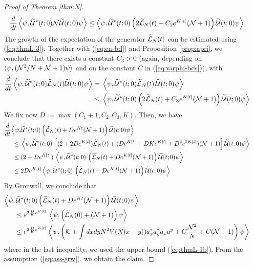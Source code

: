 \documentclass[11pt,a4paper,DIV11]{scrartcl}	%
\newcommand{\cU}{{\cal U}}
\newcommand{\wt}{\widetilde}
\newcommand{\cK}{{\cal K}}
\newcommand{\cL}{{\cal L}}
\newcommand{\cN}{{\cal N}}
\begin{document}
\begin{proof}[Proof of Theorem \ref{thm:N}]
\[ \begin{split} 
\frac{d}{dt} \left\langle \psi, \wt{\cU}^* (t;0) \cN \wt{\cU} (t;0) \psi \right\rangle  \leq  \left\langle \psi , \wt{\cU}^* (t;0)  \left(2 \wt{\cL}_N (t) +C_2 e^{K|t|} (\cN + 1) \right)  \wt{\cU} (t;0) \psi \right\rangle
\end{split} \]
The growth of the expectation of the generator $\wt{\cL}_N (t)$ can be estimated using (\ref{eq:thmL-3}). Together with (\ref{eq:en-bd}) and Proposition \ref{prop:apri}, we conclude that there exists a constant $C_3 >0$ (again, depending on $\langle \psi , (\cN^2/ N + \cN + 1) \psi \rangle$ and on the constant $C$ in (\ref{eq:varphi-bds})), with 
\[ \begin{split}
\frac{d}{dt} \left\langle \psi, \wt{\cU}^* (t;0) \wt{\cL}_N (t) \wt{\cU} (t;0) \psi \right\rangle = \; & \left\langle \psi, \wt{\cU}^* (t;0) \dot{\wt{\cL}}_N (t) \, \wt{\cU} (t;0) \psi \right\rangle \\ \leq \; & \left\langle \psi , \wt{\cU}^* (t;0) \left( 2 \wt{\cL}_N (t) + C_3 e^{K|t|} (\cN + 1) \right) \wt{\cU} (t;0) \psi \right\rangle 
\end{split} \]
We fix now $D := \max (C_1 + 1, C_2 , C_3 , K)$. Then, we have
\[ \begin{split} 
\frac{d}{dt} \Big\langle \psi , &\wt{\cU}^* (t;0) \left( \wt{\cL}_N (t) + D e^{K t} (\cN + 1) \right) \wt{\cU} (t;0) \psi \Big\rangle \\  \leq \; & \left\langle \psi, \wt{\cU}^* (t;0) \, \left[ (2 + 2D e^{K|t|}) \wt{\cL}_N (t) + (D e^{K |t|} +D K e^{K |t|} + D^2 e^{2K |t|}) (\cN + 1) \right] \wt{\cU} (t;0) \psi \right\rangle\\  \leq \; &(2 + D e^{K|t|}) \, \left\langle \psi, \wt{\cU}^* (t;0) \, \left( \wt{\cL}_N (t) + D e^{K|t|} (\cN + 1) \right) \wt{\cU} (t;0) \psi \right \rangle \\ \leq \; & 2D e^{K |t|} \left\langle \psi, \wt{\cU}^* (t;0) \, \left( \wt{\cL}_N (t) + D e^{K|t|} (\cN + 1) \right) \wt{\cU} (t;0) \psi \right\rangle \end{split} \]
By Gronwall, we conclude that
\[ \begin{split}  \Big\langle \psi , \wt{\cU}^* &(t;0) \left( \wt{\cL}_N (t) + 
D e^{K t} (\cN + 1) \right) \wt{\cU} (t;0) \psi \Big\rangle \\ \leq \; & e^{2 \frac{D}{K} e^{K |t|}} \, \left\langle \psi , \left( \wt{\cL}_N (0) + (\cN + 1)\right) \psi \right\rangle \\ \leq \; &  e^{2 \frac{D}{K} e^{K |t|}} \left\langle \psi , \left( \cK + \int dx dy N^2 V(N (x-y)) a_x^* a_y^* a_x a^y + C \frac{\cN^2}{N} + C (\cN+ 1) \right) \psi \right\rangle \end{split} \]
where in the last inequality, we used the upper bound (\ref{eq:thmL-1b}). {F}rom the assumption (\ref{eq:ass-grw}), we obtain the claim.
\end{proof}
\end{document}
